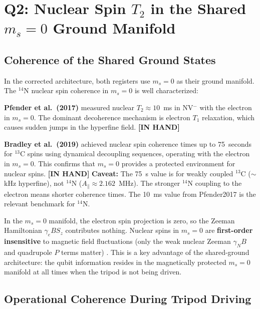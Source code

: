 \documentclass[11pt,letterpaper]{article}
\newcommand{\inhand}{\textcolor{green!50!black}{\textbf{[IN HAND]}}}
\begin{document}
\section{Q2: Nuclear Spin $T_2$ in the Shared $m_s = 0$ Ground Manifold}
\label{sec:q2}

\subsection{Coherence of the Shared Ground States}

In the corrected architecture, both registers use $m_s = 0$ as their ground manifold. The $^{14}$N nuclear spin coherence in $m_s = 0$ is well characterized:

\medskip
\noindent\textbf{Pfender et al.\ (2017)} \cite{Pfender2017} measured nuclear $T_2 \approx 10$~ms in NV$^-$ with the electron in $m_s = 0$. The dominant decoherence mechanism is electron $T_1$ relaxation, which causes sudden jumps in the hyperfine field. \inhand %

\medskip
\noindent\textbf{Bradley et al.\ (2019)} \cite{Bradley2019} achieved nuclear spin coherence times up to 75~seconds for $^{13}$C spins using dynamical decoupling sequences, operating with the electron in $m_s = 0$. This confirms that $m_s = 0$ provides a protected environment for nuclear spins. \inhand %
\textbf{Caveat:} The 75~s value is for weakly coupled $^{13}$C ($\sim$kHz hyperfine), not $^{14}$N ($A_\parallel \approx 2.162$~MHz). The stronger $^{14}$N coupling to the electron means shorter coherence times. The 10~ms value from Pfender2017 is the relevant benchmark for $^{14}$N.

\medskip
\noindent In the $m_s = 0$ manifold, the electron spin projection is zero, so the Zeeman Hamiltonian $\gamma_e B S_z$ contributes nothing. Nuclear spins in $m_s = 0$ are \textbf{first-order insensitive} to magnetic field fluctuations (only the weak nuclear Zeeman $\gamma_N B$ and quadrupole $P$ terms matter) \cite{Doherty2013}. %
This is a key advantage of the shared-ground architecture: the qubit information resides in the magnetically protected $m_s = 0$ manifold at all times when the tripod is not being driven.

\subsection{Operational Coherence During Tripod Driving}
\end{document}
